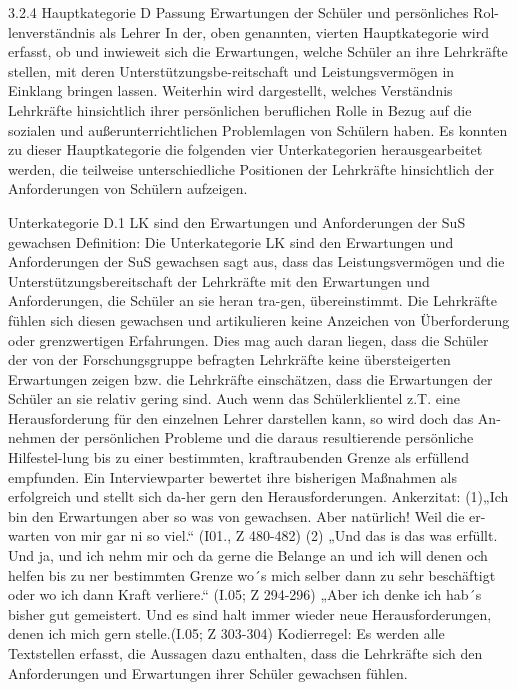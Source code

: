 3.2.4 Hauptkategorie D Passung Erwartungen der Schüler und persönliches Rol-lenverständnis als Lehrer 
In der, oben genannten, vierten Hauptkategorie wird erfasst, ob und inwieweit sich die Erwartungen, welche Schüler an ihre Lehrkräfte stellen, mit deren Unterstützungsbe-reitschaft und Leistungsvermögen in Einklang bringen lassen. Weiterhin wird dargestellt, welches Verständnis Lehrkräfte hinsichtlich ihrer persönlichen beruflichen Rolle in Bezug auf die sozialen und außerunterrichtlichen Problemlagen von Schülern haben. Es konnten zu dieser Hauptkategorie die folgenden vier Unterkategorien herausgearbeitet werden, die teilweise unterschiedliche Positionen der Lehrkräfte hinsichtlich der Anforderungen von Schülern aufzeigen. 

Unterkategorie D.1 LK sind den Erwartungen und Anforderungen der SuS gewachsen
Definition: Die Unterkategorie LK sind den Erwartungen und Anforderungen der SuS gewachsen sagt aus, dass das Leistungsvermögen und die Unterstützungsbereitschaft der Lehrkräfte mit den Erwartungen und Anforderungen, die Schüler an sie heran tra-gen, übereinstimmt. Die Lehrkräfte fühlen sich diesen gewachsen und artikulieren keine Anzeichen von Überforderung oder grenzwertigen Erfahrungen. Dies mag auch daran liegen, dass die Schüler der von der Forschungsgruppe befragten Lehrkräfte keine übersteigerten Erwartungen zeigen bzw. die Lehrkräfte einschätzen, dass die Erwartungen der Schüler an sie relativ gering sind. Auch wenn das Schülerklientel z.T. eine Herausforderung für den einzelnen Lehrer darstellen kann, so wird doch das An-nehmen der persönlichen Probleme und die daraus resultierende persönliche Hilfestel-lung bis zu einer bestimmten, kraftraubenden Grenze als erfüllend empfunden. Ein Interviewparter bewertet ihre bisherigen Maßnahmen als erfolgreich und stellt sich da-her gern den Herausforderungen.
Ankerzitat: 
(1)„Ich bin den Erwartungen aber so was von gewachsen. Aber natürlich! Weil die er-warten von mir gar ni so viel.“ (I01., Z 480-482)
(2) „Und das is das was erfüllt. Und ja, und ich nehm mir och da gerne die Belange an und ich will denen och helfen bis zu ner bestimmten Grenze wo´s mich selber dann zu sehr beschäftigt oder wo ich dann Kraft verliere.“ (I.05; Z 294-296)
„Aber ich denke ich hab´s bisher gut gemeistert. Und es sind halt immer wieder neue Herausforderungen, denen ich mich gern stelle.(I.05; Z 303-304)
Kodierregel: Es werden alle Textstellen erfasst, die Aussagen dazu enthalten, dass die Lehrkräfte sich den Anforderungen und Erwartungen ihrer Schüler gewachsen fühlen. 

